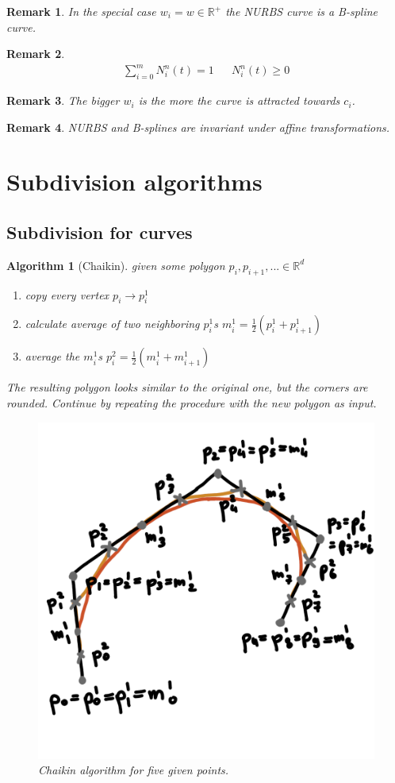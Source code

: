 \documentclass[]{article}
\newtheorem{algorithm}{Algorithm}
\newtheorem{remark}{Remark}
\begin{document}
\begin{remark}
	In the special case $w_i = w \in \mathbb{R}^+$ the NURBS curve is a B-spline curve.
\end{remark}

\begin{remark}
	\begin{align*}
		\sum_{i=0}^{m} N_i^n(t) = 1 && N_i^n(t) \geq 0
	\end{align*}
\end{remark}

\begin{remark}
	The bigger $w_i$ is the more the curve is attracted towards $c_i$.
\end{remark}

\begin{remark}
	NURBS and B-splines are invariant under affine transformations.
\end{remark}

\section{Subdivision algorithms}

\subsection{Subdivision for curves}

\begin{algorithm}[Chaikin]
	given some polygon $p_i, p_{i+1}, ... \in \mathbb{R}^d$
	
	\begin{enumerate}
		\item copy every vertex $p_i \rightarrow p_i^1$
		\item calculate average of two neighboring $p_i^1$s $m_i^1 = \frac{1}{2}(p_i^1 + p_{i+1}^1)$
		\item average the $m_i^1$s $p_i^2 = \frac{1}{2}(m_i^1 + m_{i+1}^1)$
	\end{enumerate}
	
	The resulting polygon looks similar to the original one, but the corners are rounded. Continue by repeating the procedure with the new polygon as input.
	
	\begin{figure}[h!]
		\centering
		\includegraphics[width=0.3\linewidth]{figures/chaikin}
		\caption{Chaikin algorithm for five given points.}
		\label{fig:chaikin}
	\end{figure}
	
\end{algorithm}
\end{document}
